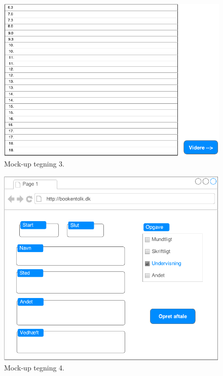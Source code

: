 \documentclass[12pt]{article}   %
\begin{document}
\begin{figure}[!ht]
\begin{center}
\includegraphics{mock3.pdf}
\caption{Mock-up tegning 3.}
\end{center}
\end{figure}


\newpage

\begin{figure}[!ht]
\begin{center}
\includegraphics{mock4.pdf}
\caption{Mock-up tegning 4.}
\end{center}
\end{figure}
\end{document}

